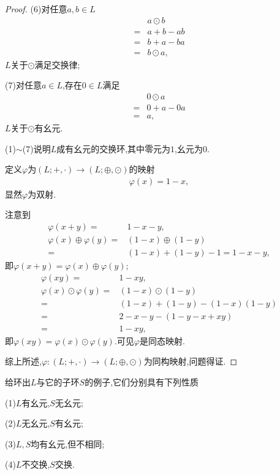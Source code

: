 \begin{proof}
    (6)对任意$a,b\in L$\begin{align*}
        &a\odot b\\
        =&a+b-ab\\
        =&b+a-ba\\
        =&b\odot a,
    \end{align*}$L$关于$\odot$满足交换律;

    (7)对任意$a\in L$,存在$0\in L$满足\begin{align*}
        &0\odot a\\
        =&0+a-0a\\
        =&a,
    \end{align*}$L$关于$\odot$有幺元.

    (1)$\sim$(7)说明$L$成有幺元的交换环,其中零元为$1$,幺元为$0$.

    定义$\varphi$为$(L;+,\cdot)\to(L;\oplus,\odot)$的映射\begin{align*}
        \varphi(x)=1-x,
    \end{align*}显然$\varphi$为双射.

    注意到\begin{align*}
        \varphi(x+y)=&1-x-y,\\
        \varphi(x)\oplus\varphi(y)=&(1-x)\oplus(1-y)\\
        =&(1-x)+(1-y)-1=1-x-y,
    \end{align*}即$\varphi(x+y)=\varphi(x)\oplus\varphi(y)$;\begin{align*}
        \varphi(xy)=&1-xy,\\
        \varphi(x)\odot\varphi(y)=&(1-x)\odot(1-y)\\
        =&(1-x)+(1-y)-(1-x)(1-y)\\
        =&2-x-y-(1-y-x+xy)\\
        =&1-xy,
    \end{align*}即$\varphi(xy)=\varphi(x)\odot\varphi(y)$.可见$\varphi$是同态映射.

    综上所述,$\varphi:(L;+,\cdot)\to(L;\oplus,\odot)$为同构映射,问题得证.
\end{proof}
\begin{problem}[P56T30]
    给环出$L$与它的子环$S$的例子,它们分别具有下列性质

    (1)$L$有幺元,$S$无幺元;

    (2)$L$无幺元,$S$有幺元;

    (3)$L,S$均有幺元,但不相同;

    (4)$L$不交换,$S$交换.
\end{problem}

